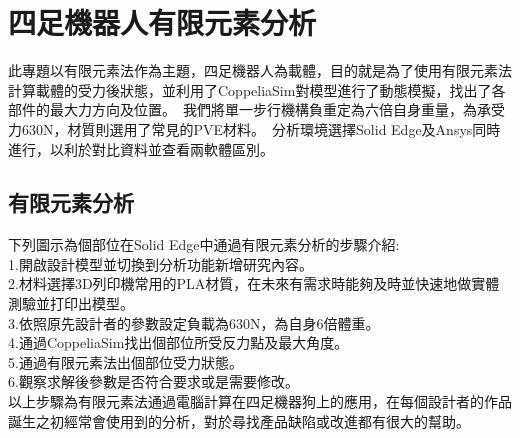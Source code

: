 \chapter{四足機器人有限元素分析}

此專題以有限元素法作為主題，四足機器人為載體，目的就是為了使用有限元素法計算載體的受力後狀態，並利用了CoppeliaSim對模型進行了動態模擬，找出了各部件的最大力方向及位置。\
我們將單一步行機構負重定為六倍自身重量，為承受力630N，材質則選用了常見的PVE材料。\
分析環境選擇Solid Edge及Ansys同時進行，以利於對比資料並查看兩軟體區別。\\

\section{有限元素分析}
 下列圖示為個部位在Solid Edge中通過有限元素分析的步驟介紹:\\
 
1.開啟設計模型並切換到分析功能新增研究內容。\\

2.材料選擇3D列印機常用的PLA材質，在未來有需求時能夠及時並快速地做實體測驗並打印出模型。\\

3.依照原先設計者的參數設定負載為630N，為自身6倍體重。\\

4.通過CoppeliaSim找出個部位所受反力點及最大角度。\\

5.通過有限元素法出個部位受力狀態。\\

6.觀察求解後參數是否符合要求或是需要修改。\\

以上步驟為有限元素法通過電腦計算在四足機器狗上的應用，在每個設計者的作品誕生之初經常會使用到的分析，對於尋找產品缺陷或改進都有很大的幫助。\\
\newpage
